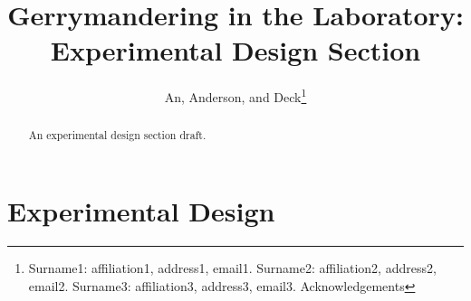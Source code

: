 \documentclass[AER]{AEA}
\begin{document}
\title{Gerrymandering in the Laboratory: Experimental Design Section}
\author{An,  Anderson, and Deck\thanks{Surname1: affiliation1, address1, email1. 
Surname2: affiliation2, address2, email2. Surname3: affiliation3, address3, email3. Acknowledgements}}

\begin{abstract}
An experimental design section draft.
\end{abstract}


\maketitle


\section{Experimental Design}
\label{section:experimental_design}
\end{document}
